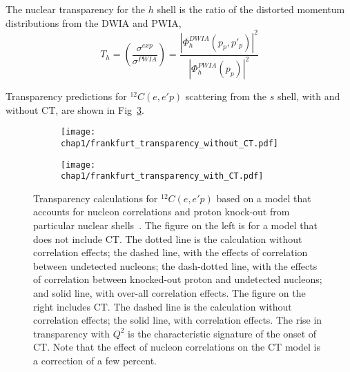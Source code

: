 The nuclear transparency for the $h$ shell is the ratio of the distorted
momentum distributions from the DWIA and PWIA,
\begin{equation}
    T_h = \left(\frac{\sigma^{exp}}{\sigma^{PWIA}}\right)
        = \frac{|\Phi^{DWIA}_h(p_p,p'_p)|^2}
               {|\Phi^{PWIA}_h(p_p)|^2}
\end{equation}

Transparency predictions for ${}^{12}C(e,e'p)$ scattering from the $s$ shell,
with and without CT, are shown in Fig~\ref{fig:frankfurt_transparency}.


\begin{figure}[h]
    \centering
    \begin{subfigure}[b]{0.45\textwidth}
        \centering
        \texttt{[image: chap1/frankfurt\_transparency\_without\_CT.pdf]}
        \label{fig:frankfurt_transparency_without_CT}
    \end{subfigure}
    \begin{subfigure}[b]{0.45\textwidth}
        \centering
        \texttt{[image: chap1/frankfurt\_transparency\_with\_CT.pdf]}
        \label{fig:frankfurt_transparency_with_CT}
    \end{subfigure}
    \caption[Transparency calculations for ${}^{12}C(e,e'p)$ based on a model
             that accounts for nucleon correlations and proton knock-out from
             particular nuclear shells~\cite{Frankfurt_1995_PRC}.]{Transparency calculations for ${}^{12}C(e,e'p)$ based on a model
             that accounts for nucleon correlations and proton knock-out from
             particular nuclear shells~\cite{Frankfurt_1995_PRC}.
             The figure on the left is for a model that does not include CT.
             The dotted line is the calculation without correlation effects;
             the dashed line, with the effects of correlation between undetected nucleons;
             the dash-dotted line, with the effects of correlation between knocked-out proton and undetected nucleons;
             and solid line, with over-all correlation effects.
             The figure on the right includes CT.
             The dashed line is the calculation without correlation effects;
             the solid line, with correlation effects.
             The rise in transparency with $Q^2$ is the characteristic
             signature of the onset of CT.
             Note that the effect of nucleon correlations on the CT model is
             a correction of a few percent.
             }
    \label{fig:frankfurt_transparency}
\end{figure}



